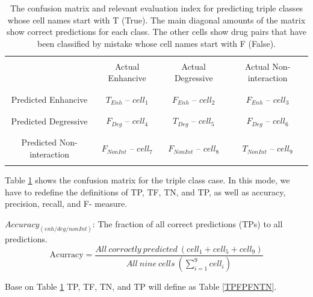 \documentclass{bmcart}
\begin{document}
\begin{table}[h!]
	\centering
	\begin{tabular}{|c|c|c|c|}
		\cline{2-4}
		\multicolumn{1}{c|}{}&&&\\
		\multicolumn{1}{c|}{} & Actual Enhancive & Actual Degressive & Actual Non-interaction\\
		\multicolumn{1}{c|}{}&&&\\
		\cline{1-4}
		&&&\\
		Predicted Enhancive & $T_{Enh}$ -- $cell_1$	 & $F_{Enh}$ -- $cell_2$&$F_{Enh}$ -- $cell_3$\\
		&&&\\
		\cline{1-4}
		&&&\\
		Predicted Degressive & $F_{Deg}$ -- $cell_4$ & $T_{Deg}$ -- $cell_5$&$F_{Deg}$ -- $cell_6$\\
		&&&\\
		\cline{1-4}
		&&&\\
		Predicted Non-interaction &$F_{NonInt}$ -- $cell_7$&$F_{NonInt}$ -- $cell_8$&$T_{NonInt}$ -- $cell_9$\\
		&&&\\
		\cline{1-4}
	\end{tabular}
	\newline
	\caption{The confusion matrix and relevant evaluation index for predicting triple classes whose cell names start with T (True). The main diagonal amounts of the matrix show correct predictions for each class. The other cells show drug pairs that have been classified by mistake whose cell names start with F (False).}
	\label{confusion_matrix_temp}
\end{table}

Table \ref{confusion_matrix_temp} shows the confusion matrix for the triple class case. In this mode, we have to redefine the definitions of TP, TF, TN, and TP, as well as accuracy, precision, recall, and F- measure.

$Accuracy_{(enh/deg/nonInt)}$: The fraction of all correct predictions (TPs) to all predictions.
$$ \mbox{Acurracy} =  \frac{All~corroctly~predicted~(cell_1 + cell_5 + cell_9)}{All~nine~cells~(\sum^9_{i=1} cell_i)} $$



Base on Table \ref{confusion_matrix_temp} TP, TF, TN, and TP will define as Table \ref{TPFPFNTN}.
\end{document}
